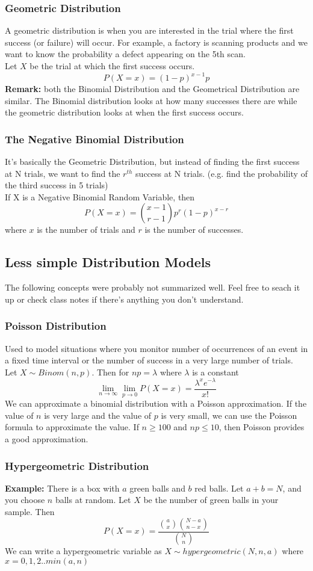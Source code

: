 \documentclass{article}
\begin{document}
\subsubsection{Geometric Distribution}
A geometric distribution is when you are interested in the trial where the first success (or failure) will occur. For example, a factory is scanning products and we want to know the probability a defect appearing on the 5th scan.\\
Let $X$ be the trial at which the first success occurs. 
\[P(X=x) = (1-p)^{x-1}p\]
\textbf{Remark:} both the Binomial Distribution and the Geometrical Distribution are similar. The Binomial distribution looks at how many successes there are while the geometric distribution looks at when the first success occurs.
\subsubsection{The Negative Binomial Distribution}
It's basically the Geometric Distribution, but instead of finding the first success at N trials, we want to find the $r^{th}$ success at N trials. (e.g. find the probability of the third success in 5 trials)\\
If X is a Negative Binomial Random Variable, then 
\[P(X=x) = \binom{x-1}{r-1}p^r(1-p)^{x-r}\]
where $x$ is the number of trials and $r$ is the number of successes.
\subsection{Less simple Distribution Models}
The following concepts were probably not summarized well. Feel free to seach it up or check class notes if there's anything you don't understand.
\subsubsection{Poisson Distribution}
Used to model situations where you monitor number of occurrences of an event in a fixed time interval or the number of success in a very large number of trials.\\
Let $X \sim Binom(n,p)$. Then for $np=\lambda$ where $\lambda$ is a constant
\[\lim_{n\to\infty}\lim_{p\to 0}P(X=x)=\frac{\lambda^xe^{-\lambda}}{x!}\]
We can approximate a binomial distribution with a Poisson approximation. If the value of $n$ is very large and the value of $p$ is very small, we can use the Poisson formula to approximate the value. If $n\geq 100$ and $np\leq10$, then Poisson provides a good approximation.
\subsubsection{Hypergeometric Distribution}
\textbf{Example: } There is a box with $a$ green balls and $b$ red balls. Let $a+b = N$, and you choose $n$ balls at random. Let $X$ be the number of green balls in your sample. Then
\[P(X=x)=\frac{\binom{a}{x}\binom{N-a}{n-x}}{\binom{N}{n}}\]
We can write a hypergeometric variable as $X\sim hypergeometric(N,n,a)$ where $x=0,1,2..min(a,n)$
\end{document}
